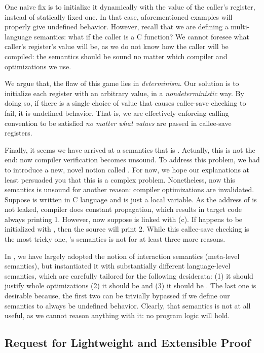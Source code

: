 {One naive fix is to initialize it dynamically with the value of the caller's register, instead of statically fixed one.
In that case, aforementioned examples will properly give undefined behavior.
However, recall that we are defining a multi-language semantics: what if the caller is a C function?
We cannot foresee what caller's register's value will be, as we do not know how the caller will be compiled: the semantics should be sound no matter which compiler and optimizations we use.


We argue that, the flaw of this game lies in \textit{determinism}.
Our solution is to initialize each register with an arbitrary value, in a \textit{nondeterministic} way.
By doing so, if there is a single choice of value that causes callee-save checking to fail, it is undefined behavior.
That is, we are effectively enforcing calling convention to be satisfied \textit{no matter what values} are passed in callee-save registers.


Finally, it seems we have arrived at a semantics that is \lbound{}.
Actually, this is not the end: now compiler verification becomes unsound.
To address this problem, we had to introduce a new, novel notion called \iptr{}.
For now, we hope our explanations at least persuaded you that this is a complex problem.
Nonetheless, now this semantics is unsound for another reason: compiler optimizations are invalidated.
Suppose  is written in C language and  is just a local variable.
As the address of  is not leaked, compiler does constant propagation, which results in target code always printing 1.
However, now suppose  is linked with (c).
If  happens to be initialized with , then the source will print 2.
While this callee-save checking is the most tricky one, \ccc{}'s semantics is not \lbound{} for at least three more reasons.


In \ccm{}, we have largely adopted the notion of interaction semantics (meta-level semantics), but instantiated it with substantially different language-level semantics, which are carefully tailored for the following desiderata:
(1) it should justify whole \cc{} optimizations (2) it should be \lbound{} and (3) it should be \ubound{}.
The last one is desirable because, the first two can be trivially bypassed if we define our semantics to always be undefined behavior.
Clearly, that semantics is not at all useful, as we cannot reason anything with it: \eg{} no program logic will hold.


\subsection{Request for Lightweight and Extensible Proof}\label{sec:introduction:proof}


}

